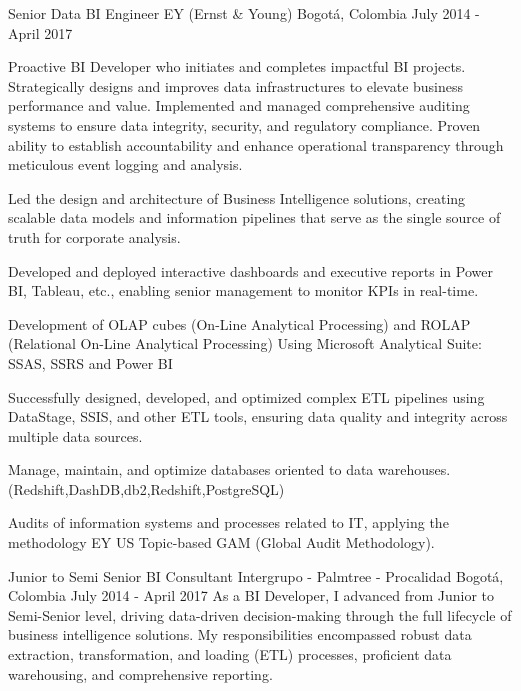 \begin{cventries}
  \cventry
    {Senior Data BI Engineer} %
    {EY (Ernst \& Young)} %
    {Bogotá, Colombia} %
    {July 2014 - April 2017} %
    {                                                 
      Proactive BI Developer who initiates and completes impactful BI projects. Strategically designs and improves data infrastructures to elevate business performance and value.
      \vspace{1.5em}
      Implemented and managed comprehensive auditing systems to ensure data integrity, security, and regulatory compliance. Proven ability to establish accountability and enhance operational transparency through meticulous event logging and analysis.      
      \vspace{1.5em}
      \begin{cvitems}
        \item {Led the design and architecture of Business Intelligence solutions, creating scalable data models and information pipelines that serve as the single source of truth for corporate analysis.}
        \item {Developed and deployed interactive dashboards and executive reports in Power BI, Tableau, etc., enabling senior management to monitor KPIs in real-time.}
        \item {Development of OLAP cubes (On-Line Analytical Processing) and ROLAP (Relational On-Line Analytical Processing) Using Microsoft Analytical Suite: SSAS, SSRS and Power BI}
        \item {Successfully designed, developed, and optimized complex ETL pipelines using DataStage, SSIS, and other ETL tools, ensuring data quality and integrity across multiple data sources.}
        \item {Manage, maintain, and optimize databases oriented to data warehouses. (Redshift,DashDB,db2,Redshift,PostgreSQL)}
        \item {Audits of information systems and processes related to IT, applying the methodology EY US Topic-based GAM (Global Audit Methodology).}
      \end{cvitems}
    }
 \cventry
    {Junior to Semi Senior BI Consultant} %
    {Intergrupo - Palmtree - Procalidad} %
    {Bogotá, Colombia} %
    {July 2014 - April 2017} %
    {                                                 
      As a BI Developer, I advanced from Junior to Semi-Senior level, driving data-driven decision-making through the full lifecycle of business intelligence solutions. My responsibilities encompassed robust data extraction, transformation, and loading (ETL) processes, proficient data warehousing, and comprehensive reporting.
}
\end{cventries}
